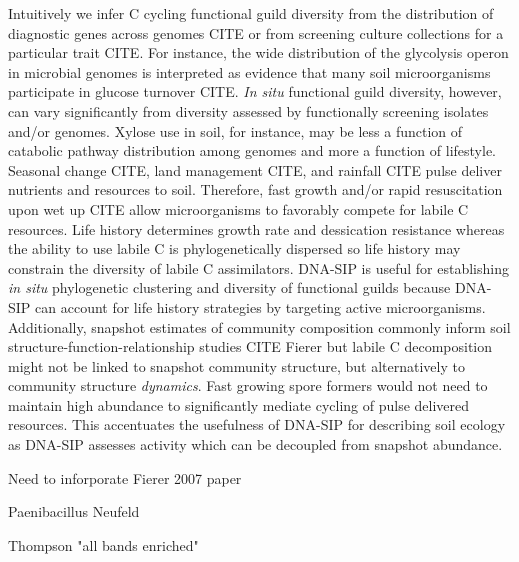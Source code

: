 Intuitively we infer C cycling functional guild diversity from the
distribution of diagnostic genes across genomes CITE or from screening
culture collections for a particular trait CITE. For instance, the wide
distribution of the glycolysis operon in microbial genomes is interpreted
as evidence that many soil microorganisms participate in glucose turnover
CITE. \textit{In situ} functional guild diversity, however, can vary
significantly from diversity assessed by functionally screening isolates
and/or genomes. Xylose use in soil, for instance, may be less a function
of catabolic pathway distribution among genomes and more a function of
lifestyle. Seasonal change CITE, land management CITE, and rainfall CITE
pulse deliver nutrients and resources to soil. Therefore, fast growth
and/or rapid resuscitation upon wet up CITE allow microorganisms to
favorably compete for labile C resources. Life history determines growth
rate and dessication resistance whereas the ability to use labile C is
phylogenetically dispersed so life history may constrain the diversity of
labile C assimilators. DNA-SIP is useful for establishing \textit{in situ}
phylogenetic clustering and diversity of functional guilds because DNA-SIP
can account for life history strategies by targeting active
microorganisms. Additionally, snapshot estimates of community composition
commonly inform soil structure-function-relationship studies CITE Fierer
but labile C decomposition might not be linked to snapshot community
structure, but alternatively to community structure \textit{dynamics}.
Fast growing spore formers would not need to maintain high abundance to
significantly mediate cycling of pulse delivered resources. This
accentuates the usefulness of DNA-SIP for describing soil ecology as
DNA-SIP assesses activity which can be decoupled from snapshot abundance. 

Need to inforporate Fierer 2007 paper

Paenibacillus Neufeld

Thompson "all bands enriched"

